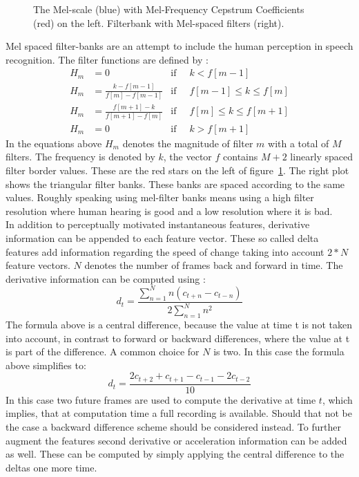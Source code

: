 \begin{figure}
\centering


\caption{The Mel-scale (blue) with Mel-Frequency Cepstrum Coefficients (red)  on the left. Filterbank with Mel-spaced filters (right).}
\label{fig:mel}
\end{figure}
Mel spaced filter-banks are an attempt to include the human perception in speech recognition. The filter functions are defined by \cite[page 317]{Huang2001}:
\begin{align}
H_m &= 0 									   &\text{if}\;\; & k < f[m-1] \\
H_m &= \frac{k      - f[m-1] }{f[m] - f[m-1]}  &\text{if}\;\; & f[m-1] \leq k \leq f[m] \\
H_m &= \frac{f[m+1] - k      }{f[m + 1] - f[m]}&\text{if}\;\; & f[m] \leq k \leq f[m+1] \\
H_m &= 0									   &\text{if}\;\; & k > f[m+1] 
\end{align} 
In the equations above $H_m$ denotes the magnitude of filter $m$ with a total of $M$ filters. The frequency is denoted by $k$, the vector $f$ contains $M+2$ linearly spaced filter border values. These are the red stars on the left of  figure~\ref{fig:mel}. The right plot shows the triangular filter banks. These banks are spaced according to the same values. Roughly speaking using mel-filter banks means using a high filter resolution where human hearing is good and a low resolution where it is bad. \\
In addition to perceptually motivated instantaneous features, derivative information can be appended to each feature vector. These so called delta features add information
regarding the speed of change taking into account $2*N$ feature vectors. $N$ denotes the number of frames back and forward in time. The derivative information can be computed using \cite{Woodland2006}:
\begin{equation}
d_t = \frac{\sum\limits_{n=1}^{N} n (c_{t+n}- c_{t-n})}{2 \sum\limits_{n=1}^{N} n^2}
\end{equation}
The formula above is a central difference, because the value at time t is not taken into account, in contrast to forward or backward differences, where the value at t is part of the difference. A common choice for $N$ is two. In this case the formula above simplifies to:
\begin{equation}
d_t = \frac{2c_{t+2} + c_{t+1} - c_{t-1} - 2c_{t-2}}{10}
\end{equation}
In this case two future frames are used to compute the derivative at time $t$, which implies, that at computation time a full recording is available. Should that not be the case a backward difference scheme should be considered instead. To further augment the features second derivative or acceleration information can be added as well. These can be computed by simply applying the central difference to the deltas one more time.


